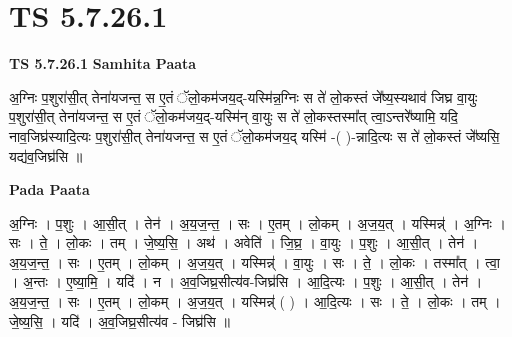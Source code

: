 \documentclass[17pt]{extarticle}
\begin{document}
\section*{ TS 5.7.26.1 }

\textbf{TS 5.7.26.1 } \newline
\textbf{Samhita Paata} \newline

अ॒ग्निः प॒शुरा॑सी॒त् तेना॑यजन्त॒ स ए॒तं ॅलो॒कम॑जय॒द्-यस्मि॑न्न॒ग्निः स ते॑ लो॒कस्तं जे᳚ष्य॒स्यथाव॑ जिघ्र वा॒युः प॒शुरा॑सी॒त् तेना॑यजन्त॒ स ए॒तं ॅलो॒कम॑जय॒द्-यस्मि॑न् वा॒युः स ते॑ लो॒कस्तस्मा᳚त् त्वा॒ऽन्तरे᳚ष्यामि॒ यदि॒ नाव॒जिघ्र॑स्यादि॒त्यः प॒शुरा॑सी॒त् तेना॑यजन्त॒ स ए॒तं ॅलो॒कम॑जय॒द् यस्मि॑ -( )-न्नादि॒त्यः स ते॑ लो॒कस्तं जे᳚ष्यसि॒ यद्य॑व॒जिघ्र॑सि ॥ \newline

\textbf{Pada Paata} \newline

अ॒ग्निः । प॒शुः । आ॒सी॒त् । तेन॑ । अ॒य॒ज॒न्त॒ । सः । ए॒तम् । लो॒कम् । अ॒ज॒य॒त् । यस्मिन्न्॑ । अ॒ग्निः । सः । ते॒ । लो॒कः । तम् । जे॒ष्य॒सि॒ । अथ॑ । अवेति॑ । जि॒घ्र॒ । वा॒युः । प॒शुः । आ॒सी॒त् । तेन॑ । अ॒य॒ज॒न्त॒ । सः । ए॒तम् । लो॒कम् । अ॒ज॒य॒त् । यस्मिन्न्॑ । वा॒युः । सः । ते॒ । लो॒कः । तस्मा᳚त् । त्वा॒ । अ॒न्तः । ए॒ष्या॒मि॒ । यदि॑ । न । अ॒व॒जिघ्र॒सीत्य॑व-जिघ्र॑सि । आ॒दि॒त्यः । प॒शुः । आ॒सी॒त् । तेन॑ । अ॒य॒ज॒न्त॒ । सः । ए॒तम् । लो॒कम् । अ॒ज॒य॒त् । यस्मिन्न्॑ ( ) । आ॒दि॒त्यः । सः । ते॒ । लो॒कः । तम् । जे॒ष्य॒सि॒ । यदि॑ । अ॒व॒जिघ्र॒सीत्य॑व - जिघ्र॑सि ॥  \newline
\end{document}
